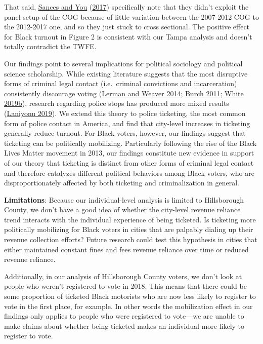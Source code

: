 \documentclass[
  12pt,
]{article}
\begin{document}
That said, \protect\hyperlink{ref-Sances2017}{Sances and You} (\protect\hyperlink{ref-Sances2017}{2017}) specifically note that they didn't exploit the panel setup of the COG because of little variation between the 2007-2012 COG to the 2012-2017 one, and so they just stuck to cross sectional. The positive effect for Black turnout in Figure 2 is consistent with our Tampa analysis and doesn't totally contradict the TWFE.

Our findings point to several implications for political sociology and political science scholarship. While existing literature suggests that the most disruptive forms of criminal legal contact (i.e.~criminal convictions and incarceration) consistently discourage voting (\protect\hyperlink{ref-Lerman2014}{Lerman and Weaver 2014}; \protect\hyperlink{ref-Burch2011}{Burch 2011}; \protect\hyperlink{ref-White2019a}{White 2019b}), research regarding police stops has produced more mixed results (\protect\hyperlink{ref-Laniyonu2019}{Laniyonu 2019}). We extend this theory to police ticketing, the most common form of police contact in America, and find that city-level increases in ticketing generally reduce turnout. For Black voters, however, our findings suggest that ticketing can be politically mobilizing. Particularly following the rise of the Black Lives Matter movement in 2013, our findings constitute new evidence in support of our theory that ticketing is distinct from other forms of criminal legal contact and therefore catalyzes different political behaviors among Black voters, who are disproportionately affected by both ticketing and criminalization in general.

\textbf{Limitations}: Because our individual-level analysis is limited to Hillsborough County, we don't have a good idea of whether the city-level revenue reliance trend interacts with the individual experience of being ticketed. Is ticketing more politically mobilizing for Black voters in cities that are palpably dialing up their revenue collection efforts? Future research could test this hypothesis in cities that either maintained constant fines and fees revenue reliance over time or reduced revenue reliance.

Additionally, in our analysis of Hillsborough County voters, we don't look at people who weren't registered to vote in 2018. This means that there could be some proportion of ticketed Black motorists who are now less likely to register to vote in the first place, for example. In other words the mobilization effect in our findings only applies to people who were registered to vote---we are unable to make claims about whether being ticketed makes an individual more likely to register to vote.
\end{document}
